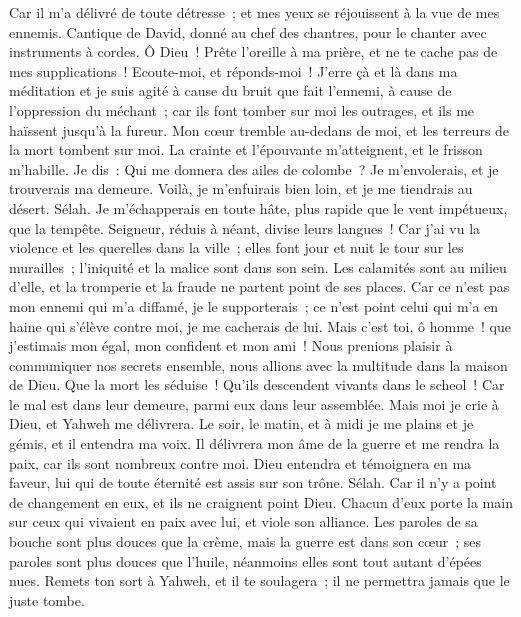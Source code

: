 \begin{multicols}{2}
Car il m'a délivré de toute détresse~; et mes yeux se réjouissent à la vue de mes ennemis.
\VerseOne{}Cantique de David, donné au chef des chantres, pour le chanter avec instruments à cordes.
Ô Dieu~! Prête l'oreille à ma prière, et ne te cache pas de mes supplications~!
Ecoute-moi, et réponds-moi~! J'erre çà et là dans ma méditation et je suis agité
à cause du bruit que fait l'ennemi, à cause de l'oppression du méchant~; car ils font tomber sur moi les outrages, et ils me haïssent jusqu'à la fureur.
Mon cœur tremble au-dedans de moi, et les terreurs de la mort tombent sur moi.
La crainte et l'épouvante m'atteignent, et le frisson m'habille.
Je dis~: Qui me donnera des ailes de colombe~? Je m'envolerais, et je trouverais ma demeure.
Voilà, je m'enfuirais bien loin, et je me tiendrais au désert. Sélah.
Je m'échapperais en toute hâte, plus rapide que le vent impétueux, que la tempête.
Seigneur, réduis à néant, divise leurs langues~! Car j'ai vu la violence et les querelles dans la ville~;
elles font jour et nuit le tour sur les murailles~; l'iniquité et la malice sont dans son sein.
Les calamités sont au milieu d'elle, et la tromperie et la fraude ne partent point de ses places.
Car ce n'est pas mon ennemi qui m'a diffamé, je le supporterais~; ce n'est point celui qui m'a en haine qui s'élève contre moi, je me cacherais de lui.
Mais c'est toi, ô homme~! que j'estimais mon égal, mon confident et mon ami~!
Nous prenions plaisir à communiquer nos secrets ensemble, nous allions avec la multitude dans la maison de Dieu.
Que la mort les séduise~! Qu'ils descendent vivants dans le scheol~! Car le mal est dans leur demeure, parmi eux dans leur assemblée.
Mais moi je crie à Dieu, et Yahweh me délivrera.
Le soir, le matin, et à midi je me plains et je gémis, et il entendra ma voix.
Il délivrera mon âme de la guerre et me rendra la paix, car ils sont nombreux contre moi.
Dieu entendra et témoignera en ma faveur, lui qui de toute éternité est assis sur son trône. Sélah. Car il n'y a point de changement en eux, et ils ne craignent point Dieu.
Chacun d'eux porte la main sur ceux qui vivaient en paix avec lui, et viole son alliance.
Les paroles de sa bouche sont plus douces que la crème, mais la guerre est dans son cœur~; ses paroles sont plus douces que l'huile, néanmoins elles sont tout autant d'épées nues.
Remets ton sort à Yahweh, et il te soulagera~; il ne permettra jamais que le juste tombe.

\end{multicols}
